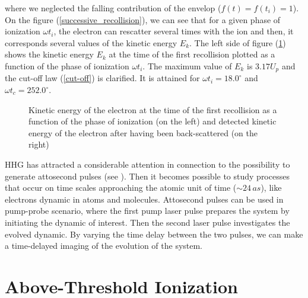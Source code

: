 \documentclass[a4paper]{article}
\begin{document}
where we neglected the falling contribution of the envelop ($f(t)=f(t_{i})=1$). \\
On the figure (\ref{successive_recollision}), we can see that for a given phase of ionization $\omega t_{i}$, the electron can rescatter several times with the ion and then, it corresponds several values of the kinetic energy $E_{k}$. 
The left side of figure (\ref{kinetic_energy}) shows the kinetic energy $E_{k}$ at the time of the first recollision plotted as a function of the phase of ionization $\omega t_{i}$. The maximum value of $E_{k}$ is $3.17U_{p}$ and the cut-off law (\ref{cut-off}) is clarified. It is attained for $\omega t_{i}=18.0^{\circ}$ and $\omega t_{c}=252.0^{\circ}$. \\
\begin{figure}
\centering
 
 \caption{Kinetic energy of the electron at the time of the first recollision as a function of the phase of ionization (on the left) and detected kinetic energy of the electron after having been back-scattered (on the right)}
 \label{kinetic_energy} 
\end{figure}

HHG has attracted a considerable attention in connection to the possibility to generate attosecond pulses (see \cite{Ivanov_2009}).
Then it becomes possible to study processes that occur on time scales approaching the atomic unit of time ($\sim 24\,as$), like electrons dynamic in atoms and molecules. 
Attosecond pulses can be used in pump-probe scenario, where the first pump laser pulse prepares the system by initiating the dynamic of interest. Then the second laser pulse investigates the evolved dynamic. By varying the time delay between the two pulses, we can make a time-delayed imaging of the evolution of the system.


\section{Above-Threshold Ionization}
\end{document}
